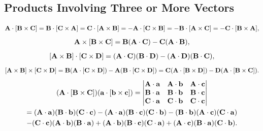 \subsection{Products Involving Three or More Vectors}\label{sec:1.2.4}
\begin{gather}
\mathbf{A} \cdot[\mathbf{B} \times \mathbf{C}]=\mathbf{B} \cdot[\mathbf{C} \times \mathbf{A}]=\mathbf{C} \cdot[\mathbf{A} \times \mathbf{B}]=-\mathbf{A} \cdot[\mathbf{C} \times \mathbf{B}]=-\mathbf{B} \cdot[\mathbf{A} \times \mathbf{C}]=-\mathbf{C} \cdot[\mathbf{B} \times \mathbf{A}],  \label{eq:1:2:29}\end{gather}
\begin{gather}
\mathbf{A} \times[\mathbf{B} \times \mathbf{C}]=\mathbf{B}(\mathbf{A} \cdot \mathbf{C})-\mathbf{C}(\mathbf{A} \cdot \mathbf{B}),  \label{eq:1:2:30}\end{gather}
\begin{gather}
{[\mathbf{A} \times \mathbf{B}] \cdot[\mathbf{C} \times \mathbf{D}]=(\mathbf{A} \cdot \mathbf{C})(\mathbf{B} \cdot \mathbf{D})-(\mathbf{A} \cdot \mathbf{D})(\mathbf{B} \cdot \mathbf{C}),}  \label{eq:1:2:31}\end{gather}
\begin{gather}
{[\mathbf{A} \times \mathbf{B}] \times[\mathbf{C} \times \mathbf{D}]=\mathbf{B}(\mathbf{A} \cdot[\mathbf{C} \times \mathbf{D}])-\mathbf{A}(\mathbf{B} \cdot[\mathbf{C} \times \mathbf{D}])=\mathbf{C}(\mathbf{A} \cdot[\mathbf{B} \times \mathbf{D}])-\mathbf{D}(\mathbf{A} \cdot[\mathbf{B} \times \mathbf{C}]) .}  \label{eq:1:2:32}\end{gather}
\begin{gather}
(\mathbf{A} \cdot[\mathbf{B} \times \mathbf{C}])(\mathbf{a} \cdot[\mathbf{b} \times \mathbf{c}])=\begin{vmatrix}
\mathbf{A} \cdot \mathbf{a} & \mathbf{A} \cdot \mathbf{b} & \mathbf{A} \cdot \mathbf{c} \\
\mathbf{B} \cdot \mathbf{a} & \mathbf{B} \cdot \mathbf{b} & \mathbf{B} \cdot \mathbf{c} \\
\mathbf{C} \cdot \mathbf{a} & \mathbf{C} \cdot \mathbf{b} & \mathbf{C} \cdot \mathbf{c}
\end{vmatrix}  \notag\\
=(\mathbf{A} \cdot \mathbf{a})(\mathbf{B} \cdot \mathbf{b})(\mathbf{C} \cdot \mathbf{c})-(\mathbf{A} \cdot \mathbf{a})(\mathbf{B} \cdot \mathbf{c})(\mathbf{C} \cdot \mathbf{b})-(\mathbf{B} \cdot \mathbf{b})(\mathbf{A} \cdot \mathbf{c})(\mathbf{C} \cdot \mathbf{a})  \notag\\
-(\mathbf{C} \cdot \mathbf{c})(\mathbf{A} \cdot \mathbf{b})(\mathbf{B} \cdot \mathbf{a})+(\mathbf{A} \cdot \mathbf{b})(\mathbf{B} \cdot \mathbf{c})(\mathbf{C} \cdot \mathbf{a})+(\mathbf{A} \cdot \mathbf{c})(\mathbf{B} \cdot \mathbf{a})(\mathbf{C} \cdot \mathbf{b}) . \label{eq:1:2:33}
\end{gather}
